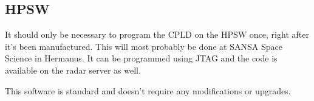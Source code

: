 \clearpage

\subsection{HPSW}
\label{subsec:sw_hpsw}
It should only be necessary to program the CPLD on the HPSW once, right after it's been manufactured. This will most probably be done at SANSA Space Science in Hermanus. It can be programmed using JTAG and the code is available on the radar server as well.
\par
This software is standard and doesn't require any modifications or upgrades.

\clearpage